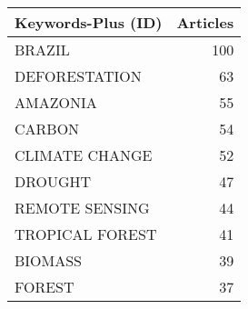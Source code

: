 
\begin{tabular}{lr}
\toprule
Keywords-Plus (ID) & Articles\\
\midrule
BRAZIL & 100\\
DEFORESTATION & 63\\
AMAZONIA & 55\\
CARBON & 54\\
CLIMATE CHANGE & 52\\
\addlinespace
DROUGHT & 47\\
REMOTE SENSING & 44\\
TROPICAL FOREST & 41\\
BIOMASS & 39\\
FOREST & 37\\
\bottomrule
\end{tabular}